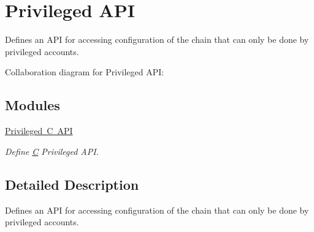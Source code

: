 \hypertarget{group__privilegedapi}{}\section{Privileged A\+PI}
\label{group__privilegedapi}


Defines an A\+PI for accessing configuration of the chain that can only be done by privileged accounts.  


Collaboration diagram for Privileged A\+PI\+:
\subsection*{Modules}
\begin{DoxyCompactItemize}
\item 
\mbox{\hyperlink{group__privilegedcapi}{Privileged C A\+PI}}
\begin{DoxyCompactList}\small\item\em Define \mbox{\hyperlink{struct_c}{C}} Privileged A\+PI. \end{DoxyCompactList}\end{DoxyCompactItemize}


\subsection{Detailed Description}
Defines an A\+PI for accessing configuration of the chain that can only be done by privileged accounts. 

